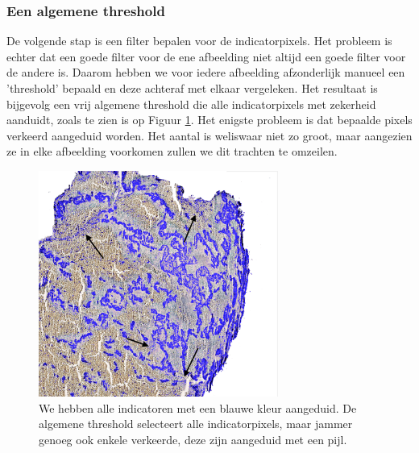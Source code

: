 \documentclass[a4paper,kulak]{kulakarticle}
\begin{document}
\subsubsection{Een algemene threshold}
De volgende stap is een filter bepalen voor de indicatorpixels. Het probleem is echter dat een goede filter voor de ene afbeelding niet altijd een goede filter voor de andere is. Daarom hebben we voor iedere afbeelding afzonderlijk manueel een 'threshold' bepaald en deze achteraf met elkaar vergeleken. Het resultaat is bijgevolg een vrij algemene threshold die alle indicatorpixels met zekerheid aanduidt, zoals te zien is op Figuur \ref{figuur alg_tresh}. Het enigste probleem is dat bepaalde pixels verkeerd aangeduid worden. Het aantal is weliswaar niet zo groot, maar aangezien ze in elke afbeelding voorkomen zullen we dit trachten te omzeilen.
\begin{figure}[H]
	\centering
	\includegraphics[width = 0.7\textwidth]{algemene_threshold}
	
	\caption{We hebben alle indicatoren met een blauwe kleur aangeduid. De algemene threshold selecteert alle indicatorpixels, maar jammer genoeg ook enkele verkeerde, deze zijn aangeduid met een pijl.}
	\label{figuur alg_tresh}
\end{figure}
\end{document}
